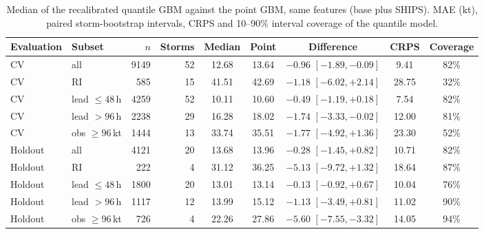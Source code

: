 \documentclass[11pt]{article}
\begin{document}
\begin{table}[t]
\centering
\caption{Median of the recalibrated quantile GBM against the point GBM, same features (base plus
SHIPS). MAE (kt), paired storm-bootstrap intervals, CRPS and 10--90\% interval coverage of the
quantile model.}
\label{tab:prob}
\begin{tabular}{llrrccccc}
\toprule
Evaluation & Subset & $n$ & Storms & Median & Point & Difference & CRPS & Coverage \\
\midrule
CV      & all              & 9149 & 52 & 12.68 & 13.64 & $-0.96$ $[-1.89, -0.09]$ & 9.41 & 82\% \\
CV      & RI               &  585 & 15 & 41.51 & 42.69 & $-1.18$ $[-6.02, +2.14]$ & 28.75 & 32\% \\
CV      & lead $\le 48$\,h & 4259 & 52 & 10.11 & 10.60 & $-0.49$ $[-1.19, +0.18]$ & 7.54 & 82\% \\
CV      & lead $> 96$\,h   & 2238 & 29 & 16.28 & 18.02 & $-1.74$ $[-3.33, -0.02]$ & 12.00 & 81\% \\
CV      & obs $\ge 96$\,kt & 1444 & 13 & 33.74 & 35.51 & $-1.77$ $[-4.92, +1.36]$ & 23.30 & 52\% \\
\midrule
Holdout & all              & 4121 & 20 & 13.68 & 13.96 & $-0.28$ $[-1.45, +0.82]$ & 10.71 & 82\% \\
Holdout & RI               &  222 &  4 & 31.12 & 36.25 & $-5.13$ $[-9.72, +1.32]$ & 18.64 & 87\% \\
Holdout & lead $\le 48$\,h & 1800 & 20 & 13.01 & 13.14 & $-0.13$ $[-0.92, +0.67]$ & 10.04 & 76\% \\
Holdout & lead $> 96$\,h   & 1117 & 12 & 13.99 & 15.12 & $-1.13$ $[-3.49, +0.81]$ & 11.02 & 90\% \\
Holdout & obs $\ge 96$\,kt &  726 &  4 & 22.26 & 27.86 & $-5.60$ $[-7.55, -3.32]$ & 14.05 & 94\% \\
\bottomrule
\end{tabular}
\end{table}
\end{document}
